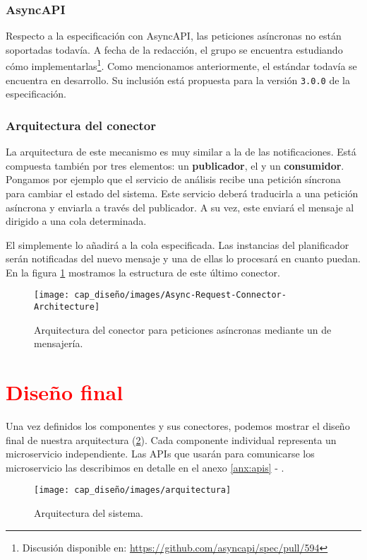 \subsubsection{AsyncAPI}

Respecto a la especificación con AsyncAPI, las peticiones asíncronas no están soportadas todavía. A fecha de la redacción, el grupo se encuentra estudiando cómo implementarlas\footnote{Discusión disponible en: \url{https://github.com/asyncapi/spec/pull/594}}. Como mencionamos anteriormente, el estándar todavía se encuentra en desarrollo. Su inclusión está propuesta para la versión \texttt{3.0.0} de la especificación.

\subsubsection{Arquitectura del conector}

La arquitectura de este mecanismo es muy similar a la de las notificaciones. Está compuesta también por tres elementos: un \textbf{publicador}, el \textbf{} y un \textbf{consumidor}. Pongamos por ejemplo que el servicio de análisis recibe una petición síncrona para cambiar el estado del sistema. Este servicio deberá traducirla a una petición asíncrona y enviarla a través del publicador. A su vez, este enviará el mensaje al  dirigido a una cola determinada.

El  simplemente lo añadirá a la cola especificada. Las instancias del planificador serán notificadas del nuevo mensaje y una de ellas lo procesará en cuanto puedan. En la figura \ref{fig:async-request-connector-architecture} mostramos la estructura de este último conector.

\begin{figure}[h!]
  \centering
  \texttt{[image: cap\_diseño/images/Async-Request-Connector-Architecture]}
  \caption{Arquitectura del conector para peticiones asíncronas mediante un  de mensajería.}
  \label{fig:async-request-connector-architecture}
\end{figure}

\pagebreak

\section{\textcolor{red}{Diseño final}}

Una vez definidos los componentes y sus conectores, podemos mostrar el diseño final de nuestra arquitectura (\ref{fig:arquitectura-sistema}). Cada componente individual representa un microservicio independiente. Las APIs que usarán para comunicarse los microservicio las describimos en detalle en el anexo \ref{anx:apis} - .


\begin{figure}[h!]
  \hspace{-1cm}
  \texttt{[image: cap\_diseño/images/arquitectura]}
  \caption{Arquitectura del sistema.}
  \label{fig:arquitectura-sistema}
\end{figure}
